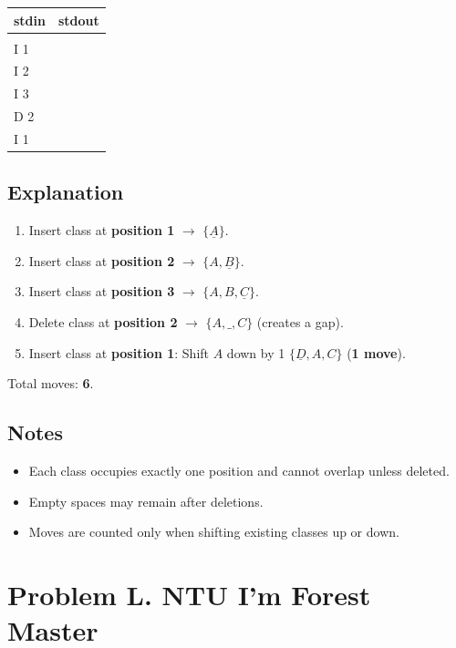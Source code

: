\documentclass[12pt,a4paper]{article}
\begin{document}
\begin{table}[h]
  \centering
  \begin{tabularx}{\textwidth}{|>{\ttfamily}X|>{\ttfamily}X|}
  \hline
  \textbf{stdin} & \textbf{stdout} \\
  \hline
  5 & 6 \\
  I 1 &  \\
  I 2 & \\
  I 3 & \\
  D 2 &\\
  I 1 & \\
  \hline
 \end{tabularx}
\end{table}

\subsection*{\fontsize{16}{12}Explanation}
\begin{enumerate}
    \item Insert class at \textbf{position 1} $\rightarrow$ \(\{\underline{A}\}\).
    \item Insert class at \textbf{position 2} $\rightarrow$ \(\{A, \underline{B}\}\).
    \item Insert class at \textbf{position 3} $\rightarrow$ \(\{A, B, \underline{C}\}\).
    \item Delete class at \textbf{position 2} $\rightarrow$ \(\{A, \_, C\}\) (creates a gap).
    \item Insert class at \textbf{position 1}: Shift \( A \) down by 1 \(\{\underline{D}, A, C\}\) (\textbf{1 move}).
\end{enumerate}
Total moves: \textbf{6}.

\subsection*{\fontsize{16}{12}Notes}
\begin{itemize}
    \item Each class occupies exactly one position and cannot overlap unless deleted.
    \item Empty spaces may remain after deletions.
    \item Moves are counted only when shifting existing classes up or down.
\end{itemize}

\newpage
\section*{\fontsize{18}{12}Problem L. NTU I'm Forest Master}
\end{document}
